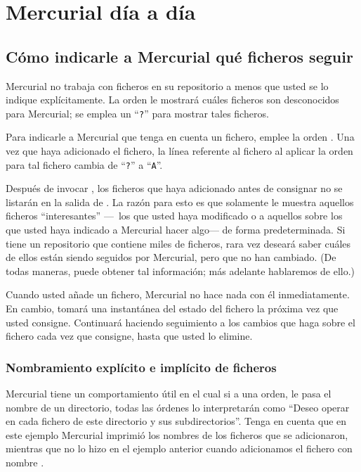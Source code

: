 \chapter{Mercurial día a día}
\label{chap:daily}

\section{Cómo indicarle a Mercurial qué ficheros seguir}

Mercurial no trabaja con ficheros en su repositorio a menos que usted
se lo indique explícitamente.  La orden  le mostrará
cuáles ficheros son desconocidos para Mercurial; se emplea un
``\texttt{?}'' para mostrar tales ficheros.

Para indicarle a Mercurial que tenga en cuenta un fichero, emplee la
orden . Una vez que haya adicionado el fichero, la línea
referente al fichero al aplicar la orden  para tal
fichero cambia de ``\texttt{?}'' a ``\texttt{A}''.

Después de invocar , los ficheros que haya adicionado
antes de consignar no se listarán en la salida de .  La
razón para esto es que  solamente le muestra aquellos
ficheros ``interesantes'' ---~los que usted haya modificado o a aquellos
sobre los que usted haya indicado a Mercurial hacer algo--- de forma
predeterminada. Si tiene un repositorio que contiene miles de
ficheros, rara vez deseará saber cuáles de ellos están siendo
seguidos por Mercurial, pero que no han cambiado.  (De todas maneras,
puede obtener tal información; más adelante hablaremos de ello.)


Cuando usted añade un fichero, Mercurial no hace nada con él inmediatamente.
En cambio, tomará una instantánea del estado del fichero la próxima vez
que usted consigne. Continuará haciendo seguimiento a los cambios que
haga sobre el fichero cada vez que consigne, hasta que usted lo elimine.

\subsection{Nombramiento explícito e implícito de ficheros}

Mercurial tiene un comportamiento útil en el cual si a una orden,
le pasa el nombre de un directorio, todas las órdenes lo interpretarán como
``Deseo operar en cada fichero de este directorio y sus 
subdirectorios''.
Tenga en cuenta que en este ejemplo Mercurial imprimió los nombres de
los ficheros que se adicionaron, mientras que no lo hizo en el ejemplo
anterior cuando adicionamos el fichero con nombre .

